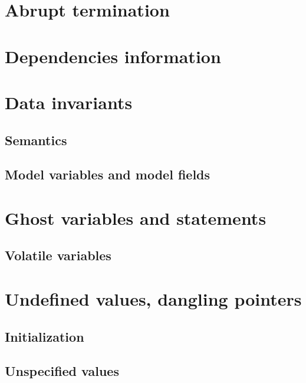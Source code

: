 \section{Abrupt termination}
\label{sec:abrupt-clauses}

\experimental

\section{Dependencies information}
\label{sec:func-dep}

\experimental

\section{Data invariants}
\label{sec:invariants}

\subsection{Semantics}

\subsection{Model variables and model fields}

\section{Ghost variables and statements}
\label{sec:ghost}

\subsection{Volatile variables}\label{sec:volatile-variables}
\experimental


\section{Undefined values, dangling pointers}

\subsection{Initialization}

\subsection{Unspecified values}
